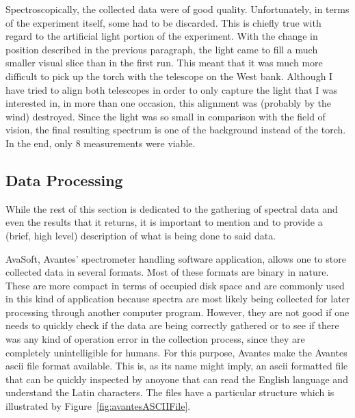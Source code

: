 \begin{table}[htpb]
    \centering
    \caption{Second run: time of measurements table.}
    \label{tab:second_run_measurements}
    
\end{table}

Spectroscopically, the collected data were of good quality.
Unfortunately, in terms of the experiment itself, some had to be
discarded. This is chiefly true with regard to the artificial light
portion of the experiment. With the change in position described in the
previous paragraph, the light came to fill a much smaller visual slice
than in the first run. This meant that it was much more difficult to
pick up the torch with the telescope on the West bank. Although I have
tried to align both telescopes in order to only capture the light that I
was interested in, in more than one occasion, this alignment was
(probably by the wind) destroyed. Since the light was so small in
comparison with the field of vision, the final resulting spectrum is one
of the background instead of the torch. In the end, only 8 measurements
were viable. 

\subsection{Data Processing}%
\label{sub:data_processing}

While the rest of this section is dedicated to the gathering of spectral
data and even the results that it returns, it is important to mention
and to provide a (brief, high level) description of what is being done
to said data.

AvaSoft, Avantes' spectrometer handling software application, allows one
to store collected data in several formats. Most of these formats are
binary in nature. These are more compact in terms of occupied disk space
and are commonly used in this kind of application because spectra are
most likely being collected for later processing through another
computer program. However, they are not good if one needs to quickly
check if the data are being correctly gathered or to see if there was
any kind of operation error in the collection process, since they are
completely unintelligible for humans. For this purpose, Avantes make the
Avantes \gls{ascii} file format available. This is, as its name might
imply, an \gls{ascii} formatted file that can be quickly inspected by
anoyone that can read the English language and understand the Latin
characters. The files have a particular structure which is illustrated
by Figure~\ref{fig:avantesASCIIFile}.

